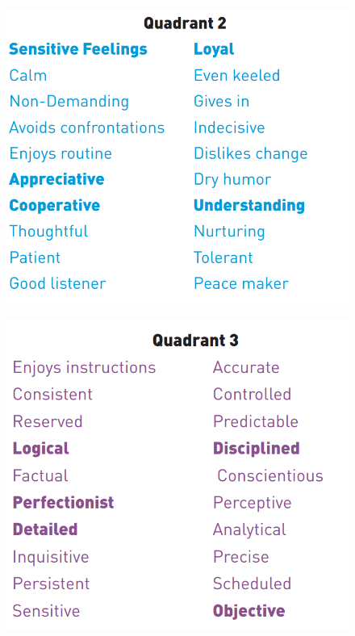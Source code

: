\begin{figure}[H]
    \centering
    \includegraphics[width=0.9\linewidth, height=0.47\textheight]{images/chap3/ws2.png}
\end{figure}

\begin{figure}[H]
    \centering
    \includegraphics[width=0.9\linewidth, height=0.47\textheight]{images/chap3/ws3.png}
\end{figure}

